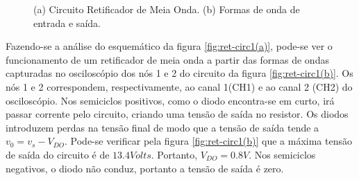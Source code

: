 \documentclass[a4paper]{article} %
\begin{document}
\begin{figure}[h!]
\begin{centering}
\subfloat[]{

 \label{fig:ret-circ1(a)}
}

\par\end{centering}
\caption{(a) Circuito Retificador de Meia Onda. (b)  Formas de onda de entrada e saída. \label{fig:ret-circ1}}
\end{figure}

\newpage
          Fazendo-se a análise do esquemático da figura  \ref{fig:ret-circ1(a)}, pode-se ver o funcionamento de um retificador de meia onda a partir das formas de ondas capturadas no osciloscópio dos nós 1 e 2 do circuito da figura  \ref{fig:ret-circ1(b)}. Os nós 1 e 2 correspondem, respectivamente, ao canal 1(CH1) e ao canal 2 (CH2) do osciloscópio. Nos semiciclos positivos, como o diodo encontra-se em curto, irá passar corrente pelo circuito, criando uma tensão de saída no resistor. Os diodos introduzem perdas na tensão final de modo que a tensão de saída tende a $v_0=v_s-V_{DO}$. Pode-se verificar pela figura  \ref{fig:ret-circ1(b)} que a máxima tensão de saída do circuito é de   $13.4 Volts$. Portanto,    $V_{DO}= 0.8V $. Nos semiciclos negativos, o diodo não conduz, portanto a tensão de saída é zero.
    
\end{document}
